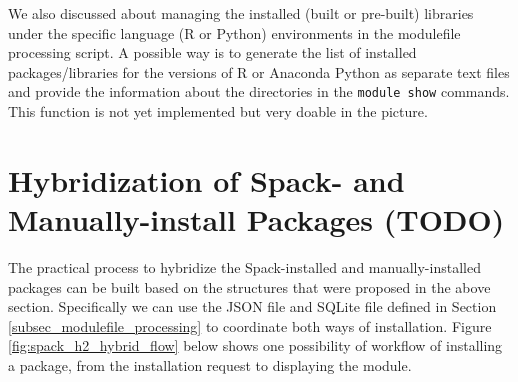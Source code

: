 \documentclass[conference]{IEEEtran}
\begin{document}
We also discussed about managing the installed (built or pre-built) libraries under the specific language (R or Python) environments in the modulefile processing script. A possible way is to generate the list of installed packages/libraries for the versions of R or Anaconda Python as separate text files and provide the information about the directories in the \texttt{module show} commands. This function is not yet implemented but very doable in the picture.


\section{Hybridization of Spack- and Manually-install Packages (TODO)} \label{sec_workflow}


The practical process to hybridize the Spack-installed and manually-installed packages can be built based on the structures that were proposed in the above section. Specifically we can use the JSON file and SQLite file defined in Section \ref{subsec_modulefile_processing} to coordinate both ways of installation. Figure \ref{fig:spack_h2_hybrid_flow} below shows one possibility of workflow of installing a package, from the installation request to displaying the module.
\end{document}
